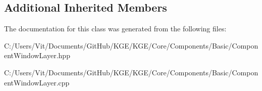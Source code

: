 \subsection*{Additional Inherited Members}


The documentation for this class was generated from the following files\-:\begin{DoxyCompactItemize}
\item 
C\-:/\-Users/\-Vit/\-Documents/\-Git\-Hub/\-K\-G\-E/\-K\-G\-E/\-Core/\-Components/\-Basic/Component\-Window\-Layer.\-hpp\item 
C\-:/\-Users/\-Vit/\-Documents/\-Git\-Hub/\-K\-G\-E/\-K\-G\-E/\-Core/\-Components/\-Basic/Component\-Window\-Layer.\-cpp\end{DoxyCompactItemize}
